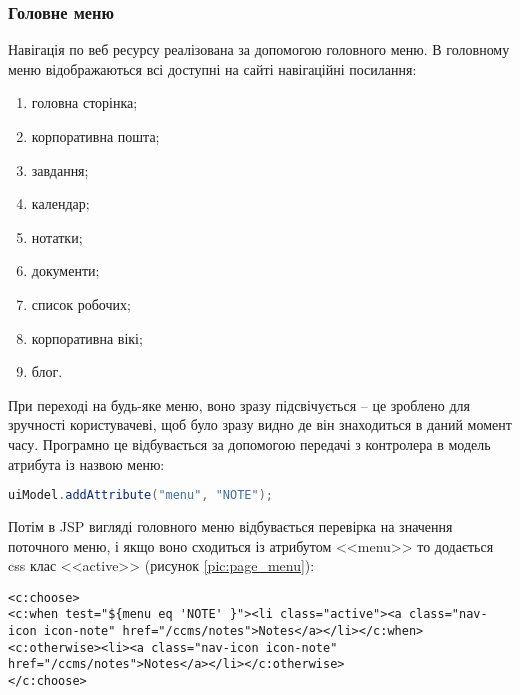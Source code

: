 \subsubsection{Головне меню}
\par Навігація по веб ресурсу реалізована за допомогою головного меню. В головному меню відображаються всі доступні на сайті навігаційні посилання:
\begin{enumerate}
  \item головна сторінка;
  \item корпоративна пошта;
  \item завдання;
  \item календар;
  \item нотатки;
  \item документи;
  \item список робочих;
  \item корпоративна вікі;
  \item блог.
\end{enumerate}
\par При переході на будь-яке меню, воно зразу підсвічується -- це зроблено для зручності користувачеві, щоб було зразу видно де він знаходиться в даний момент часу. Програмно це відбувається за допомогою передачі з контролера в модель атрибута із назвою меню:
\begin{lstlisting}[language=Java]
uiModel.addAttribute("menu", "NOTE");
\end{lstlisting}
\par Потім в JSP вигляді головного меню відбувається перевірка на значення поточного меню, і якщо воно сходиться із атрибутом <<menu>> то додається css клас <<active>> (рисунок \ref{pic:page_menu}):

\begin{lstlisting}
<c:choose>
<c:when test="${menu eq 'NOTE' }"><li class="active"><a class="nav-icon icon-note" href="/ccms/notes">Notes</a></li></c:when>
<c:otherwise><li><a class="nav-icon icon-note" href="/ccms/notes">Notes</a></li></c:otherwise>
</c:choose>
\end{lstlisting}

